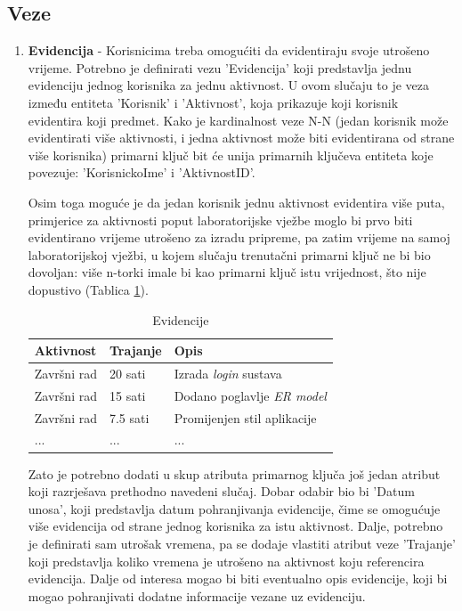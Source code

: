 \documentclass[times, utf8, zavrsni]{fer}
\begin{document}
\subsection{Veze}
\begin{enumerate}[leftmargin=*]
\item \textbf{Evidencija} -
Korisnicima treba omogućiti da evidentiraju svoje utrošeno vrijeme. Potrebno je definirati vezu 'Evidencija' koji predstavlja jednu evidenciju jednog korisnika za jednu aktivnost. U ovom slučaju to je veza između entiteta 'Korisnik' i 'Aktivnost', koja prikazuje koji korisnik evidentira koji predmet. Kako je kardinalnost veze N-N (jedan korisnik može evidentirati više aktivnosti, i jedna aktivnost može biti evidentirana od strane više korisnika) primarni ključ bit će unija primarnih ključeva entiteta koje povezuje: 'KorisnickoIme' i 'AktivnostID'.

Osim toga moguće je da jedan korisnik jednu aktivnost evidentira više puta, primjerice za aktivnosti poput laboratorijske vježbe moglo bi prvo biti evidentirano vrijeme utrošeno za izradu pripreme, pa zatim vrijeme na samoj laboratorijskoj vježbi, u kojem slučaju trenutačni primarni ključ ne bi bio dovoljan: više n-torki imale bi kao primarni ključ istu vrijednost, što nije dopustivo (Tablica \ref{tbl:tablica-evidencija}). 

\begin{table}[H]
\caption{Evidencije}
\label{tbl:tablica-evidencija}
\centering
\begin{tabular}{lll} \hline
Aktivnost & Trajanje & Opis\\ \hline
Završni rad & 20 sati & Izrada \emph{login} sustava\\ 
Završni rad & 15 sati & Dodano poglavlje \emph{ER model}\\
Završni rad & 7.5 sati & Promijenjen stil aplikacije\\
... & ... & ...\\
\end{tabular}
\end{table}

Zato je potrebno dodati u skup atributa primarnog ključa još jedan atribut koji razrješava prethodno navedeni slučaj. Dobar odabir bio bi 'Datum unosa', koji predstavlja datum pohranjivanja evidencije, čime se omogućuje više evidencija od strane jednog korisnika za istu aktivnost. Dalje, potrebno je definirati sam utrošak vremena, pa se dodaje vlastiti atribut veze 'Trajanje' koji predstavlja koliko vremena je utrošeno na aktivnost koju referencira evidencija. Dalje od interesa mogao bi biti eventualno opis evidencije, koji bi mogao pohranjivati dodatne informacije vezane uz evidenciju.\\


\end{enumerate}
\end{document}
